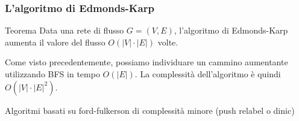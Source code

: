 \documentclass{beamer}
\begin{document}
\begin{frame}
\frametitle{L'algoritmo di Edmonds-Karp}
\begin{block}{Teorema}
Data una rete di flusso $G=(V,E)$, l'algoritmo di Edmonds-Karp aumenta il valore del flusso $O(|V|\cdot|E|)$ volte.
\end{block}
Come visto precedentemente, possiamo individuare un cammino aumentante utilizzando BFS in tempo $O(|E|)$. La complessità dell'algoritmo è quindi $O(|V|\cdot|E|^2)$.
\end{frame}

\begin{frame}
Algoritmi basati su ford-fulkerson di complessità minore (push relabel o dinic)
\end{frame}
\end{document}
